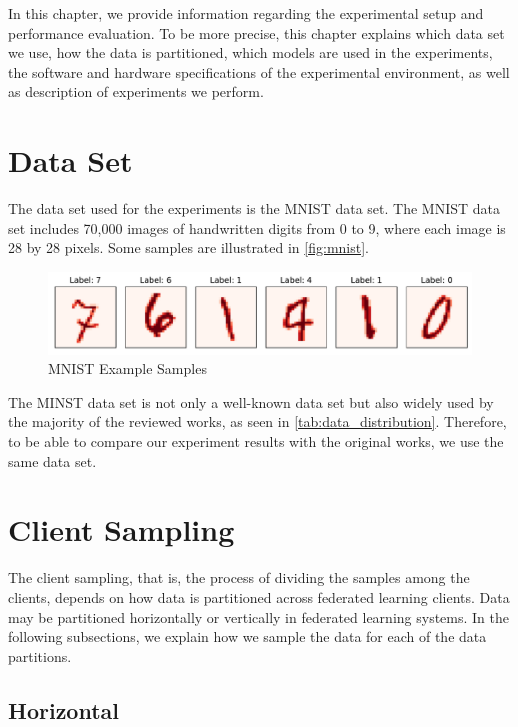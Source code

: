 In this chapter, we provide information regarding the experimental setup and performance evaluation. To be more precise, this chapter explains which data set we use, how the data is partitioned, which models are used in the experiments, the software and hardware specifications of the experimental environment, as well as description of experiments we perform.

\section{Data Set}\label{eval:data_set}

The data set used for the experiments is the MNIST \cite{lecun2010mnist} data set. The MNIST data set includes 70,000 images of handwritten digits from 0 to 9, where each image is 28 by 28 pixels. Some samples are illustrated in \autoref{fig:mnist}.

\begin{figure}[!htp]
    \centering
    \centering
    \includegraphics[width=1\textwidth]{graphics/mnist.pdf}
    \caption{MNIST Example Samples}
    \label{fig:mnist}
\end{figure}

The MINST data set is not only a well-known data set but also widely used by the majority of the reviewed works, as seen in \autoref{tab:data_distribution}. Therefore, to be able to compare our experiment results with the original works, we use the same data set.

\section{Client Sampling}\label{eval:client_sampling}

The client sampling, that is, the process of dividing the samples among the clients, depends on how data is partitioned across federated learning clients. Data may be partitioned horizontally or vertically in federated learning systems. In the following subsections, we explain how we sample the data for each of the data partitions.

\subsection{Horizontal}

